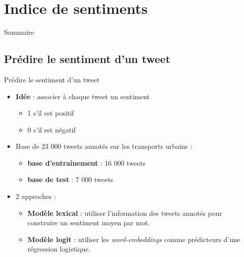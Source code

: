 \documentclass[10pt,xcolor=table,color={dvipsnames,usenames},ignorenonframetext,usepdftitle=false,french]{beamer}
\providecommand{\tightlist}{%
  \setlength{\parskip}{0pt}
  }
\begin{document}
\hypertarget{indice-de-sentiments}{%
\section{Indice de sentiments}\label{indice-de-sentiments}}

\begin{frame}{Sommaire}
\protect\hypertarget{sommaire-2}{}


\end{frame}

\hypertarget{pruxe9dire-le-sentiment-dun-tweet}{%
\subsection{Prédire le sentiment d’un
tweet}\label{pruxe9dire-le-sentiment-dun-tweet}}

\begin{frame}{Prédire le sentiment d’un tweet}
\protect\hypertarget{pruxe9dire-le-sentiment-dun-tweet-1}{}

\begin{itemize}
\tightlist
\item
  \textbf{Idée} : associer à chaque tweet un sentiment

  \begin{itemize}
  \tightlist
  \item
    1 s’il est positif
  \item
    0 s’il est négatif
  \end{itemize}
\end{itemize}

\medskip

\begin{itemize}
\tightlist
\item
  Base de 23 000 tweets annotés sur les transports urbains :

  \begin{itemize}
  \tightlist
  \item
    \textbf{base d’entraînement} : 16 000 tweets
  \item
    \textbf{base de test} : 7 000 tweets
  \end{itemize}
\end{itemize}

\medskip

\begin{itemize}
\tightlist
\item
  2 approches :

  \begin{itemize}
  \tightlist
  \item
    \textbf{Modèle lexical} : utiliser l’information des tweets annotés
    pour construire un sentiment moyen par mot.
  \item
    \textbf{Modèle logit} : utiliser les \emph{word-embeddings} comme
    prédicteurs d’une régression logistique.
  \end{itemize}
\end{itemize}

\end{frame}
\end{document}
